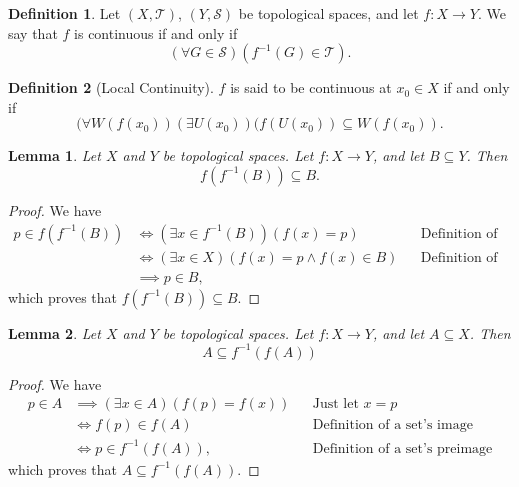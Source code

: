 \documentclass[10pt,a4paper]{article}
\author{Jeremiah Givens}
\theoremstyle{theorem}
\newtheorem{lemma}{Lemma}
\theoremstyle{definition}
\newtheorem{definition}{Definition}
\newcommand{\Tau}{\mathcal{T}}
\begin{document}
\begin{definition}
Let $(X, \Tau)$, $(Y, \mathcal{S})$ be topological spaces, and let $f : X \to Y$. We say that $f$ is continuous if and only if 
\begin{equation*}
(\forall G \in \mathcal{S})(f^{-1}(G) \in \Tau).
\end{equation*}
\end{definition}

\begin{definition}[Local Continuity] $f$ is said to be continuous at $x_0 \in X$ if and only if 
\begin{equation*}
(\forall W(f(x_0))(\exists U(x_0))(f(U(x_0)) \subseteq W(f(x_0)).
\end{equation*}
\end{definition}

\begin{lemma}
Let $X$ and $Y$ be topological spaces. Let $f:X \to Y$, and let $B \subseteq Y$. Then
\begin{equation*}
f(f^{-1}(B)) \subseteq B.
\end{equation*}
\end{lemma}

\begin{proof}
We have
\begin{align*}
p \in f(f^{-1}(B)) &\iff (\exists x \in f^{-1}(B))(f(x) = p) &&\text{Definition of a set's image}\\
&\iff (\exists x \in X)(f(x) = p \land f(x) \in B)&&\text{Definition of a set's preimage}\\
&\implies p \in B,
\end{align*}
which proves that $f(f^{-1}(B)) \subseteq B$.
\end{proof}

\begin{lemma}
Let $X$ and $Y$ be topological spaces. Let $f:X \to Y$, and let $A \subseteq X$. Then
\begin{equation*}
A \subseteq f^{-1}(f(A))
\end{equation*}
\end{lemma}

\begin{proof}
We have
\begin{align*}
p \in A &\implies (\exists x \in A)(f(p) = f(x)) &&\text{Just let } x = p\\
&\iff f(p) \in f(A)&&\text{Definition of a set's image}\\
&\iff p \in f^{-1}(f(A)),&&\text{Definition of a set's preimage}
\end{align*}
which proves that $A \subseteq f^{-1}(f(A))$.
\end{proof}
\end{document}
